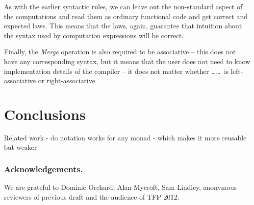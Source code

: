 \documentclass[runningheads,a4paper]{llncs}
\begin{document}
As with the earlier syntactic rules, we can leave out the non-standard aspect
of the computations and read them as ordinary functional code and get correct and 
expected laws. This means that the laws, again, guarantee that intuition about the
syntax used by computation expressions will be correct.

Finally, the \emph{Merge} operation is also required to be associative -- this does not have
any corresponding syntax, but it means that the user does not need to know implementation
details of the compiler -- it does not matter whether \ldots{}\ldots\,
is left-associative or right-associative.


\section{Conclusions}
\label{sec:conclusions}

Related work - do notation works for any monad - which makes it more reusable but weaker


\subsubsection{Acknowledgements.} We are grateful to Dominic Orchard, Alan Mycroft, Sam Lindley,
anonymous reviewers of previous draft and the audience of TFP 2012.




\end{document}
